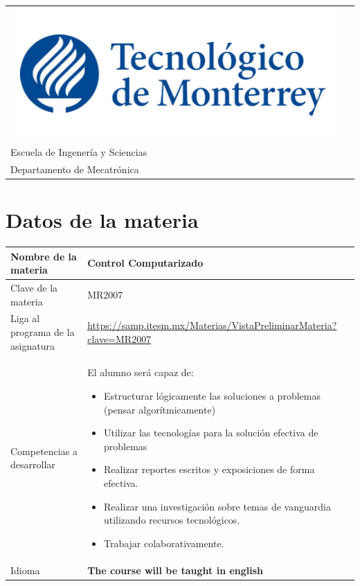 \documentclass[letter, 10pt]{scrartcl}
\begin{document}

\begin{tabularx}{\linewidth}{Xc}
\includegraphics[width=\linewidth]{../figures/tec-logo.png}
&
\begin{minipage}[b]{0.6\linewidth}
\centering
Campus Estado de M\'exico\\
Escuela de Ingener\'ia y Sciencias\\
Departamento de Mecatr\'onica
\end{minipage}
\end{tabularx} 

%
\section*{Datos de la materia}

\begin{tabularx}{\linewidth}{|L|X|}
\hline
Nombre de la materia & Control Computarizado\\\hline
Clave de la materia & MR2007\\\hline
Liga al programa de la asignatura & \url{https://samp.itesm.mx/Materias/VistaPreliminarMateria?clave=MR2007}\\\hline
Competencias a desarrollar 
& \begin{minipage}[t]{\linewidth}
    El alumno será capaz de:
    \begin{itemize}[noitemsep,nolistsep]
      \item Estructurar lógicamente las soluciones a problemas (pensar algorítmicamente)
      \item Utilizar las tecnologías para la solución efectiva de problemas
      \item Realizar reportes escritos y exposiciones de forma efectiva.
      \item Realizar una investigación sobre temas de vanguardia utilizando recursos tecnológicos.
      \item Trabajar colaborativamente.
    \end{itemize}
  \end{minipage}\\\hline
Idioma & \textbf{The course will be taught in english}\\\hline
\end{tabularx}
\end{document}
